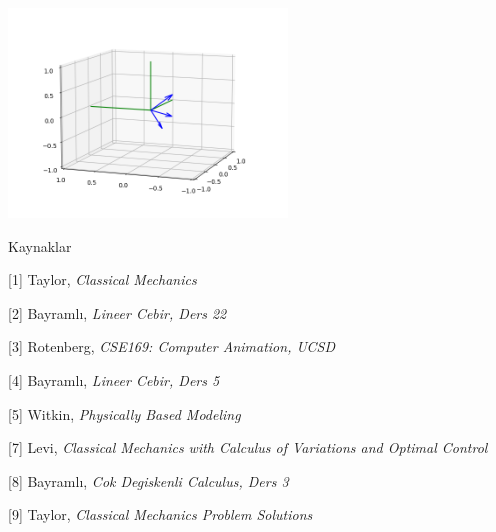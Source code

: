 \documentclass[12pt,fleqn]{article}\usepackage{../../common}
\begin{document}
\includegraphics[width=20em]{phy_005_basics_04_02.png}


Kaynaklar

[1] Taylor, {\em Classical Mechanics}

[2] Bayramlı, {\em Lineer Cebir, Ders 22}

[3] Rotenberg, {\em CSE169: Computer Animation, UCSD}

[4] Bayramlı, {\em Lineer Cebir, Ders 5}

[5] Witkin, {\em Physically Based Modeling}

[7] Levi, {\em Classical Mechanics with Calculus of Variations and Optimal Control}

[8] Bayramlı, {\em Cok Degiskenli Calculus, Ders 3}
    
[9] Taylor, {\em Classical Mechanics Problem Solutions}
\end{document}
